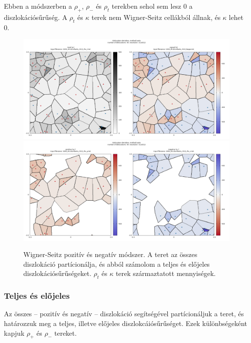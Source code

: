 \documentclass[10pt,a4paper]{scrartcl}
\begin{document}
Ebben a módszerben a $\rho_+$, $\rho_-$ és $\rho_t$ terekben sehol sem lesz 0 a diszlokációsűrűség. A $\rho_t$ és $\kappa$ terek nem Wigner-Seitz cellákból állnak, és $\kappa$ lehet 0.

\begin{center}
\begin{figure}
\includegraphics[width=\textwidth]{"../xpattern/example_with_64_dislocations/1000_64.dconfwsts_r512_ts.txt"}
\includegraphics[width=\textwidth]{"../xpattern/example_with_64_dislocations/1000_64.dconfwsts_r512_pn.txt"}
\caption{Wigner-Seitz pozitív és negatív módszer. A teret az összes diszlokáció partícionálja, és abból számolom a teljes és előjeles diszlokációsűrűségeket. $\rho_t$ és $\kappa$ terek származtatott mennyiségek.}
\end{figure}
\end{center}

\subsubsection{Teljes és előjeles}
Az összes -- pozitív és negatív -- diszlokáció segítségével partícionáljuk a teret, és határozzuk meg a teljes, illetve előjeles diszlokcáiósűrűséget. Ezek különbségeként kapjuk $\rho_+$ és $\rho_-$ tereket.
\end{document}
